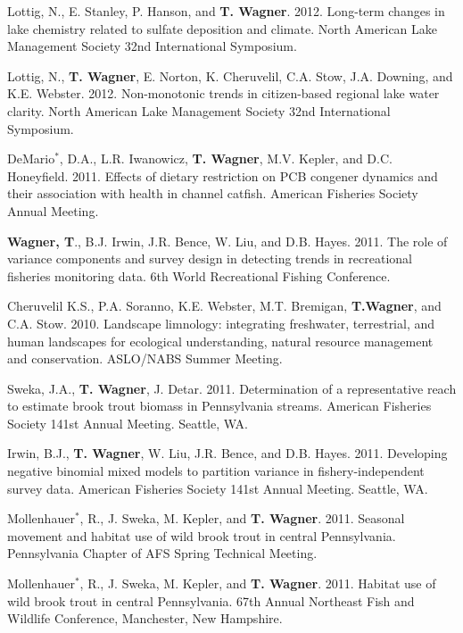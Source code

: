 \documentclass[10pt]{article}
\begin{document}
\begin{flushleft}
\begin{etaremune}
\item Lottig, N., E. Stanley, P. Hanson, and {\bf T. Wagner}. 2012. Long-term changes in lake chemistry related to sulfate deposition and climate. North American Lake Management Society 32nd International Symposium.

\item Lottig, N., {\bf T. Wagner}, E. Norton, K. Cheruvelil, C.A. Stow, J.A. Downing, and K.E. Webster. 2012. Non-monotonic trends in citizen-based regional lake water clarity. North American Lake Management Society 32nd International Symposium.


\item DeMario$^*$, D.A., L.R. Iwanowicz, {\bf T. Wagner}, M.V. Kepler, and D.C. Honeyfield. 2011. Effects of dietary restriction on PCB congener dynamics and their association with health in channel catfish. American Fisheries Society Annual Meeting. 

\item {\bf Wagner, T}., B.J. Irwin, J.R. Bence, W. Liu, and D.B. Hayes. 2011. The role of variance components and survey design in detecting trends in recreational fisheries monitoring data. 6th World Recreational Fishing Conference. 

\item Cheruvelil K.S., P.A. Soranno, K.E. Webster, M.T. Bremigan, {\bf T.Wagner}, and C.A. Stow. 2010. Landscape limnology: integrating freshwater, terrestrial, and human landscapes for ecological understanding, natural resource management and conservation. ASLO/NABS Summer Meeting.

\item Sweka, J.A., {\bf T. Wagner}, J. Detar. 2011. Determination of a representative reach to estimate brook trout biomass in Pennsylvania streams. American Fisheries Society 141st Annual Meeting. Seattle, WA.

\item Irwin, B.J., {\bf T. Wagner}, W. Liu, J.R. Bence, and D.B. Hayes. 2011. Developing negative binomial mixed models to partition variance in fishery-independent survey data. American Fisheries Society 141st Annual Meeting. Seattle, WA.

\item Mollenhauer$^*$, R., J. Sweka, M. Kepler, and  {\bf T. Wagner}. 2011. Seasonal movement and habitat use of wild brook trout in central Pennsylvania. Pennsylvania Chapter of AFS Spring Technical Meeting.

\item Mollenhauer$^*$, R., J. Sweka, M. Kepler, and  {\bf T. Wagner}. 2011. Habitat use of wild brook trout in central Pennsylvania. 67th Annual Northeast Fish and Wildlife Conference, Manchester, New Hampshire.


\end{etaremune}
\end{flushleft}
\end{document}
